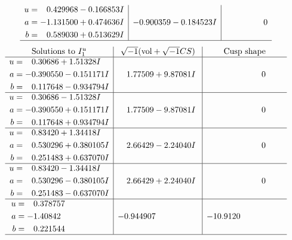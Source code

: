\documentclass[1p]{elsarticle_modified}
\theoremstyle{definition}
\newcommand{\I}{\sqrt{-1}}
\begin{document}
$$\begin{array}{c|c|c}
\begin{aligned}
u &= \phantom{-}0.429968 - 0.166853 I \\
a &= -1.131500 + 0.474636 I \\
b &= \phantom{-}0.589030 + 0.513629 I\end{aligned}
 & -0.900359 - 0.184523 I & \phantom{-0.000000 } 0\\
 \hline 
 \end{array}$$\newpage$$\begin{array}{c|c|c}  
\text{Solutions to }I^u_{1}& \I (\text{vol} + \sqrt{-1}CS) & \text{Cusp shape}\\
 \hline 
\begin{aligned}
u &= \phantom{-}0.30686 + 1.51328 I \\
a &= -0.390550 - 0.151171 I \\
b &= \phantom{-}0.117648 - 0.934794 I\end{aligned}
 & \phantom{-}1.77509 + 9.87081 I & \phantom{-0.000000 } 0 \\ \hline\begin{aligned}
u &= \phantom{-}0.30686 - 1.51328 I \\
a &= -0.390550 + 0.151171 I \\
b &= \phantom{-}0.117648 + 0.934794 I\end{aligned}
 & \phantom{-}1.77509 - 9.87081 I & \phantom{-0.000000 } 0 \\ \hline\begin{aligned}
u &= \phantom{-}0.83420 + 1.34418 I \\
a &= \phantom{-}0.530296 + 0.380105 I \\
b &= \phantom{-}0.251483 + 0.637070 I\end{aligned}
 & \phantom{-}2.66429 - 2.24040 I & \phantom{-0.000000 } 0 \\ \hline\begin{aligned}
u &= \phantom{-}0.83420 - 1.34418 I \\
a &= \phantom{-}0.530296 - 0.380105 I \\
b &= \phantom{-}0.251483 - 0.637070 I\end{aligned}
 & \phantom{-}2.66429 + 2.24040 I & \phantom{-0.000000 } 0 \\ \hline\begin{aligned}
u &= \phantom{-}0.378757\phantom{ +0.000000I} \\
a &= -1.40842\phantom{ +0.000000I} \\
b &= \phantom{-}0.221544\phantom{ +0.000000I}\end{aligned}
 & -0.944907\phantom{ +0.000000I} & -10.9120\phantom{ +0.000000I}\\
 \hline 
 \end{array}$$\newpage\newpage\renewcommand{\arraystretch}{1}
\end{document}
